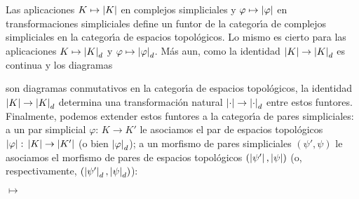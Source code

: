 Las aplicaciones $K\mapsto\left|K\right|$ en complejos simpliciales y
$\varphi\mapsto\left|\varphi\right|$ en transformaciones simpliciales
define un funtor de la categor\'{\i}a de complejos simpliciales en la
categor\'{\i}a de espacios topol\'{o}gicos. Lo mismo es cierto para las
aplicaciones $K\mapsto\left|K\right|_{d}$ y $\varphi\mapsto\left|\varphi\right|_{d}$.
M\'{a}s aun, como la identidad $\left|K\right|\rightarrow\left|K\right|_{d}$ es continua
y los diagramas
\begin{center}
\end{center}
son diagramas conmutativos en la categor\'{\i}a de espacios topol\'{o}gicos,
la identidad $\left|K\right|\rightarrow\left|K\right|_{d}$ determina una transformaci\'{o}n
natural $\left|\cdot\right|\rightarrow\left|\cdot\right|_{d}$ entre estos funtores.
Finalmente, podemos extender estos funtores a la categor\'{\i}a de pares
simpliciales: a un par simplicial $\varphi:\,K\rightarrow K'$ le
asociamos el par de espacios topol\'{o}gicos
$\left|\varphi\right|:\,\left|K\right|\rightarrow\left|K'\right|$ (o bien $\left|\varphi\right|_{d}$);
a un morfismo de pares simpliciales $(\psi',\psi)$ le asociamos el
morfismo de pares de espacios topol\'{o}gicos $(\left|\psi'\right|,\left|\psi\right|)$
(o, respectivamente, $(\left|\psi'\right|_{d},\left|\psi\right|_{d})$):
\begin{center}
	\qquad\begin{math} \longmapsto\end{math}\qquad
{}
\end{center}

